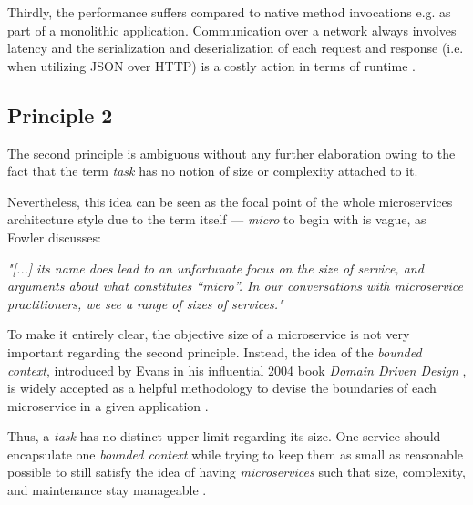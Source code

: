 \documentclass[12pt,a4paper]{report}
\begin{document}
Thirdly, the performance suffers compared to native method invocations e.g.
as part of a monolithic application. Communication over a network always
involves latency and the serialization and deserialization
of each request and response (i.e. when utilizing JSON over HTTP)
is a costly action in terms of runtime \cite{newman2015building}.


\subsection{Principle 2} \label{subsect:ms-principle-2}
The second principle is ambiguous without any further elaboration owing to
the fact that the term \textit{task} has no notion of size or complexity
attached to it.

Nevertheless, this idea can be seen as the focal point of the whole microservices
architecture style due to the term itself --- \textit{micro} to begin with
is vague, as Fowler discusses:
\begin{displayquote}
\emph{"[...] its name does lead to an unfortunate focus on the size of service,
and arguments about what constitutes “micro”.
In our conversations with microservice practitioners,
we see a range of sizes of services."}~\cite{ms-fowler}
\end{displayquote}
To make it entirely clear, the objective size of a microservice is not very
important regarding the second principle. Instead, the idea of the
\textit{bounded context}, introduced by Evans in his influential 2004 book
\textit{Domain Driven Design} \cite{evans2004ddd}, is widely accepted as
a helpful methodology to devise the boundaries of each microservice
in a given application \cite{newman2015building, ms-fowler}.

Thus, a \textit{task} has no distinct upper limit regarding its size.
One service should encapsulate one \textit{bounded context} while trying to
keep them as small as reasonable possible to still satisfy the idea of having
\textit{microservices} such that size, complexity, and maintenance stay manageable
\cite{newman2015building, ms-fowler}.
\end{document}
